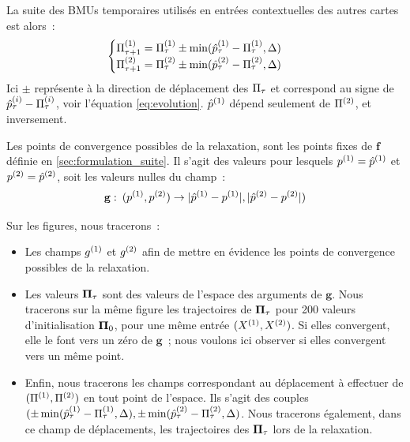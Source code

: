 \documentclass[../main]{subfiles}
\begin{document}
La suite des BMUs temporaires utilisés en entrées contextuelles des autres cartes est alors~:
\begin{align*}
	&\begin{cases}
	\Pi^{({1})}_{\tau+1} = \Pi^{({1})}_\tau \pm \min(\hat{p}^{({1})}_\tau - \Pi^{({1})}_\tau, \Delta)  \\
	\Pi^{({2})}_{\tau+1} = \Pi^{({2})}_\tau \pm \min(\hat{p}^{({2})}_\tau - \Pi^{({2})}_\tau, \Delta) \\
	\end{cases}
	\end{align*}
Ici $\pm$ représente à la direction de déplacement des $\Pi_\tau$ et correspond au signe de $\hat{p}^{({i})}_\tau - \Pi^{({i})}_\tau$, voir l'équation \ref{eq:evolution}.
$\hat{p}^{({1})}$ dépend seulement de $\Pi^{({2})}$, et inversement.

Les points de convergence possibles de la relaxation, sont les points fixes de $\mathbf{f}$ définie en \ref{sec:formulation_suite}. Il s'agit des valeurs pour lesquels $p^{({1})} = \hat{p}^{({1})}$ et $p^{({2})} = \hat{p}^{({2})}$, soit les valeurs nulles du champ~:
\begin{equation} 
	\mathbf{g}:\: (p^{({1})}, p^{({2})}) \rightarrow \lvert \hat{p}^{({1})} - p^{({1})} \rvert,  \lvert \hat{p}^{({2})} - p^{({2})} \rvert)
\end{equation}

Sur les figures, nous tracerons~:
\begin{itemize}
\item Les champs $g^{({1})}$ et $g^{({2})}$ afin de mettre en évidence les points de convergence possibles de la relaxation. 
\item Les valeurs $\mathbf{\Pi}_\tau$ sont des valeurs de l'espace des arguments de $\mathbf{g}$. Nous tracerons sur la même figure les trajectoires de  $\mathbf{\Pi}_\tau$ pour 200 valeurs d'initialisation $\mathbf{\Pi}_0$, pour une même entrée $(X^{({1})}, X^{({2})})$. Si elles convergent, elle le font vers un zéro de $\mathbf{g}$~; nous voulons ici observer si elles convergent vers un même point.
\item Enfin, nous tracerons les champs correspondant au déplacement à effectuer de $(\Pi^{({1})},\Pi^{({2})})$ en tout point de l'espace. Ils s'agit des couples $(\pm \min(\hat{p}^{({1})}_\tau - \Pi^{({1})}_\tau, \Delta), \pm \min(\hat{p}^{({2})}_\tau - \Pi^{({2})}_\tau, \Delta)$. Nous tracerons également, dans ce champ de déplacements, les trajectoires des $\mathbf{\Pi}_\tau$ lors de la relaxation.
\end{itemize}
\end{document}
